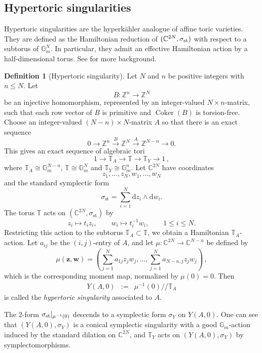 \documentclass[12pt]{amsart}
\theoremstyle{definition}
\newtheorem{defn}[prop]{Definition}
\newcommand{\bG}{\mathbb{G}}
\newcommand{\rd}{\mathrm{d}}
\numberwithin{equation}{section}
\begin{document}
\subsection{Hypertoric singularities}\label{ss-hypertoric}
Hypertoric singularities are the hyperk\"ahler analogue of affine toric varieties. They are defined as the Hamiltonian reduction of $(\mathbb{C}^{2N},\sigma_{\rm st})$ with respect to a subtorus of $\mathbb{G}_m^N$. In particular, they admit an effective Hamiltonian action by a half-dimensional torus. See \cite{BD-toric,Hausel-Sturmfels, Proudfoot-survey, Namikawa-torichyperkahler} for more background.  
\begin{defn}[Hypertoric singularity]
Let \(N\) and \(n\) be positive integers with \(n \leq N\). 
Let
\[
        B : \mathbb Z^n \longrightarrow \mathbb Z^N
\]
be an injective homomorphism, represented by an integer-valued
\(N \times n\)-matrix, such that each row vector of \(B\) is primitive and
\(\operatorname{Coker}(B)\) is torsion-free. Choose an integer-valued
\((N-n)\times N\)-matrix \(A\) so that there is an exact sequence
\[
        0 \longrightarrow \mathbb Z^n   \xrightarrow{\;B\;}  \mathbb Z^N     \xrightarrow{\;A\;}    \mathbb Z^{N-n}  \longrightarrow 0 .
\]
This gives an exact sequence of algebraic tori
\[
        1 \longrightarrow \mathbb T_A      \longrightarrow \mathbb T        \longrightarrow  \mathbb T_Y
        \longrightarrow 1 \,,
\]
where $\mathbb T_A\cong \bG_m^{N-n}$, $\mathbb T\cong \bG_m^{N}$ and $\mathbb T_Y\cong \bG_m^{n}$. 
Let \(\mathbb C^{2N}\) have coordinates
\[
        z_1,\ldots,z_N,w_1,\ldots,w_N
\]
and the standard symplectic form
\[
        \sigma_{\mathrm{st}} =  \sum_{i=1}^N \rd z_i \wedge \rd w_i .
\]
The torus $\mathbb T $ acts on $(\mathbb C^{2N},   \sigma_{\mathrm{st}})$ by
\[
        z_i \mapsto t_i z_i,
        \qquad
        w_i \mapsto t_i^{-1} w_i,
        \qquad 1 \leq i \leq N .
\]
Restricting this action to the subtorus $ \mathbb T _A\subset  \mathbb T $, we obtain a Hamiltonian $ \mathbb T _A$-action. Let \(a_{ij}\) be the \((i,j)\)-entry of \(A\), and let $ \mu \colon \mathbb C^{2N} \longrightarrow \mathbb C^{N-n}$ be defined by
\[
        \mu(\mathbf{z},\mathbf{w})
        =
        \left(
        \sum_{j=1}^N a_{1j} z_j w_j,
        \ldots,
        \sum_{j=1}^N a_{N-n,j} z_j w_j
        \right) \, ,
\]
which is the corresponding moment map, normalized by \(\mu(0)=0\).  Then
\begin{eqnarray*}
        Y(A,0)
       & := &
        \mu^{-1}(0) /\!\!/   \mathbb T_A
         \end{eqnarray*}     
is called the \emph{hypertoric singularity} associated to \(A\).

The 2-form $\sigma_{\rm st}|_{\mu^{-1}(0)}$ descends to a symplectic form $\sigma_Y$ on $Y(A,0)$. One can see that $(Y(A,0),\sigma_Y)$ is a conical symplectic singularity with a good $\bG_m$-action induced by the standard dilation on $\mathbb C^{2N}$, and $\mathbb{T}_Y$ acts on $(Y(A,0),\sigma_Y)$ by symplectomorphisms.
\end{defn}
\end{document}
